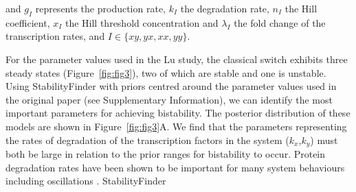 {\noindent and $g_I$ represents the production rate, $k_I$ the degradation rate, $n_I$ the Hill coefficient, $x_I$ the Hill threshold concentration and $\lambda_I$ the fold change of the transcription rates, and $I\in\{xy, yx, xx, yy\}$. 

For the parameter values used in the Lu study, the classical switch exhibits three steady states (Figure~\ref{fig:fig3}), two of which are stable and one is unstable. Using StabilityFinder with priors centred around the parameter values used in the original paper (see Supplementary Information), we can identify the most important parameters for achieving bistability. The posterior distribution of these models are shown in Figure~\ref{fig:fig3}A. We find that the parameters representing the rates of degradation of the transcription factors in the system ($k_x$,$k_y$) must both be large in relation to the prior ranges for bistability to occur. Protein degradation rates have been shown to be important for many system behaviours including oscillations \autocite{XXX}. StabilityFinder


}
